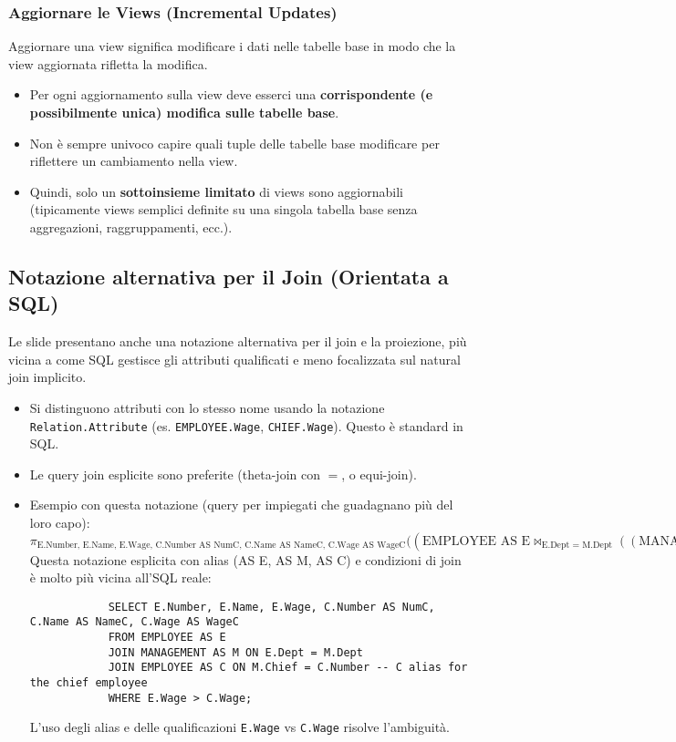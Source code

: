 \documentclass{article}
\newcommand{\project}[2]{\pi_{#1}(#2)}
\newcommand{\thetajoin}[2]{\Join_{#1}(#2)}
\begin{document}
	\subsubsection{Aggiornare le Views (Incremental Updates)}
	Aggiornare una view significa modificare i dati nelle tabelle base in modo che la view aggiornata rifletta la modifica.
	\begin{itemize}
		\item Per ogni aggiornamento sulla view deve esserci una \textbf{corrispondente (e possibilmente unica) modifica sulle tabelle base}.
		\item Non è sempre univoco capire quali tuple delle tabelle base modificare per riflettere un cambiamento nella view.
		\item Quindi, solo un \textbf{sottoinsieme limitato} di views sono aggiornabili (tipicamente views semplici definite su una singola tabella base senza aggregazioni, raggruppamenti, ecc.).
	\end{itemize}
	
	\subsection{Notazione alternativa per il Join (Orientata a SQL)}
	Le slide presentano anche una notazione alternativa per il join e la proiezione, più vicina a come SQL gestisce gli attributi qualificati e meno focalizzata sul natural join implicito.
	\begin{itemize}
		\item Si distinguono attributi con lo stesso nome usando la notazione \texttt{Relation.Attribute} (es. \texttt{EMPLOYEE.Wage}, \texttt{CHIEF.Wage}). Questo è standard in SQL.
		\item Le query join esplicite sono preferite (theta-join con $=$, o equi-join).
		\item Esempio con questa notazione (query per impiegati che guadagnano più del loro capo):
		$$ \project{\text{E.Number, E.Name, E.Wage, C.Number AS NumC, C.Name AS NameC, C.Wage AS WageC}}{(\text{EMPLOYEE AS E} \thetajoin{\text{E.Dept = M.Dept}}{(\text{MANAGEMENT AS M} \thetajoin{\text{M.Chief = C.Number}}{\text{EMPLOYEE AS C}})} \thetajoin{\text{E.Wage > C.Wage}}{()} } $$
		Questa notazione esplicita con alias (AS E, AS M, AS C) e condizioni di join è molto più vicina all'SQL reale:
		\begin{verbatim}
			SELECT E.Number, E.Name, E.Wage, C.Number AS NumC, C.Name AS NameC, C.Wage AS WageC
			FROM EMPLOYEE AS E
			JOIN MANAGEMENT AS M ON E.Dept = M.Dept
			JOIN EMPLOYEE AS C ON M.Chief = C.Number -- C alias for the chief employee
			WHERE E.Wage > C.Wage;
		\end{verbatim}
		L'uso degli alias e delle qualificazioni \texttt{E.Wage} vs \texttt{C.Wage} risolve l'ambiguità.
	\end{itemize}
	
\end{document}
